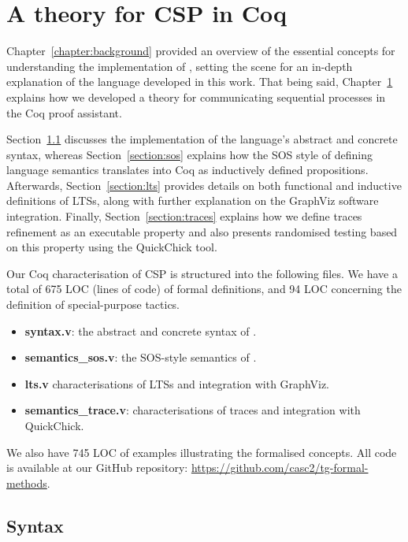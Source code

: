 \chapter{A theory for CSP in Coq}
\label{chapter:csp_coq}

Chapter~\ref{chapter:background} provided an overview of the essential concepts for understanding the implementation of \CSPcoq{}, setting the scene for an in-depth explanation of the language developed in this work. That being said, Chapter~\ref{chapter:csp_coq} explains how we developed a theory for communicating sequential processes in the Coq proof assistant.

Section~\ref{section:syntax} discusses the implementation of the language's abstract and concrete syntax, whereas Section~\ref{section:sos} explains how the SOS style of defining language semantics translates into Coq as inductively defined propositions. Afterwards, Section~\ref{section:lts} provides details on both functional and inductive definitions of LTSs, along with further explanation on the GraphViz software integration. Finally, Section~\ref{section:traces} explains how we define traces refinement as an executable property and also presents randomised testing based on this property using the QuickChick tool.

Our Coq characterisation of CSP is structured into the following files. We have a total of 675 LOC (lines of code) of formal definitions, and 94 LOC concerning the definition of special-purpose tactics.

\begin{itemize}
	\item \textbf{syntax.v}: the abstract and concrete syntax of \CSPcoq{}.
	\item \textbf{semantics\_sos.v}: the SOS-style semantics of \CSPcoq{}.
	\item \textbf{lts.v} characterisations of LTSs and integration with GraphViz.
	\item \textbf{semantics\_trace.v}: characterisations of traces and integration with QuickChick.
\end{itemize}

We also have 745 LOC of examples illustrating the formalised concepts. All code is available at our GitHub repository: \url{https://github.com/casc2/tg-formal-methods}.

\section{Syntax}
\label{section:syntax}

